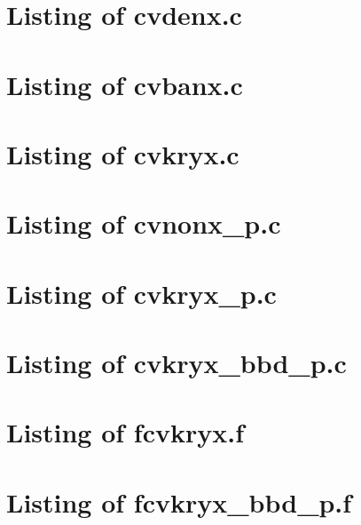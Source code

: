 
\lstset{language=C}

\newpage
\section{Listing of cvdenx.c}\label{s:cvdenx_c}

\newpage
\section{Listing of cvbanx.c}\label{s:cvbanx_c}

\newpage
\section{Listing of cvkryx.c}\label{s:cvkryx_c}


\newpage
\section{Listing of cvnonx\_p.c}\label{s:cvnonx_p_c}

\newpage
\section{Listing of cvkryx\_p.c}\label{s:cvkryx_p_c}

\newpage
\section{Listing of cvkryx\_bbd\_p.c}\label{s:cvkryx_bbd_p_c}


\lstset{language=[77]Fortran}

\newpage
\section{Listing of fcvkryx.f}\label{s:fcvkryx_f}

\newpage
\section{Listing of fcvkryx\_bbd\_p.f}\label{s:fcvkryx_bbd_p_f}


